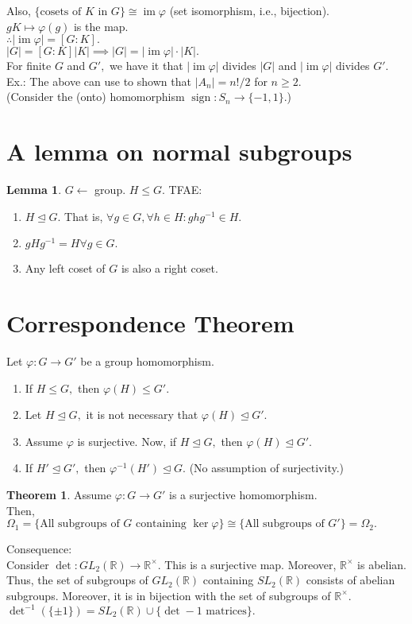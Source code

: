 \documentclass[12 pt, a4paper, toc=graduated, oneside]{article}
\theoremstyle{definition}
\newtheorem{theorem}{Theorem}
\newtheorem{lem}{Lemma}
\newcommand{\sign}{\operatorname{sign}}
\newcommand{\im}{\operatorname{im}}
\begin{document}
Also, $\{\text{cosets of }K\text{ in }G\} \cong \im \varphi$ (set isomorphism, i.e., bijection).\\
$gK \mapsto \varphi(g)$ is the map.\\
$\therefore |\im \varphi| = [G:K].$\\
$|G| = [G:K]|K| \implies |G| = |\im \varphi|\cdot|K|.$ \\
For finite $G$ and $G',$ we have it that $|\im\varphi|$ divides $|G|$ and $|\im\varphi|$ divides $G'.$\\
Ex.: The above can use to shown that $|A_n| = n!/2$ for $n \ge 2.$\\
(Consider the (onto) homomorphism $\sign:S_n \to \{-1, 1\}.$)

\section{A lemma on normal subgroups}
\begin{lem}
	$G \longleftarrow$ group. $H \le G.$ TFAE:
	\begin{enumerate}[nosep] 
		\item $H \trianglelefteq G.$ That is, $\forall g \in G, \forall h \in H : ghg^{-1} \in H.$
		\item $gHg^{-1} = H \forall g \in G.$
		\item Any left coset of $G$ is also a right coset.
	\end{enumerate}
\end{lem}

\section{Correspondence Theorem}
Let $\varphi:G \to G'$ be a group homomorphism.
\begin{enumerate}[nosep] 
	\item If $H \le G,$ then $\varphi(H) \le G'.$
	\item Let $H \trianglelefteq G,$ it is not necessary that $\varphi(H) \trianglelefteq G'.$
	\item Assume $\varphi$ is surjective. Now, if $H \trianglelefteq G,$ then $\varphi(H) \trianglelefteq G'.$
	\item If $H' \trianglelefteq G',$ then $\varphi^{-1}(H') \trianglelefteq G.$ \hfill (No assumption of surjectivity.)
\end{enumerate}
\begin{theorem}
	Assume $\varphi : G \to G'$ is a surjective homomorphism.\\
	Then, $\Omega_1 = \{\text{All subgroups of } G \text{ containing } \ker \varphi\} \cong \{\text{All subgroups of }G'\} = \Omega_2.$
\end{theorem}
Consequence:\\
Consider $\det:GL_2(\mathbb{R}) \to \mathbb{R}^\times.$ This is a surjective map. Moreover, $\mathbb{R}^\times$ is abelian.\\
Thus, the set of subgroups of $GL_2(\mathbb{R})$ containing $SL_2(\mathbb{R})$ consists of abelian subgroups. Moreover, it is in bijection with the set of subgroups of $\mathbb{R}^\times.$\\
$\det^{-1}(\{\pm1\}) = SL_2(\mathbb{R}) \cup \{\det -1 \text{ matrices}\}.$
\end{document}
